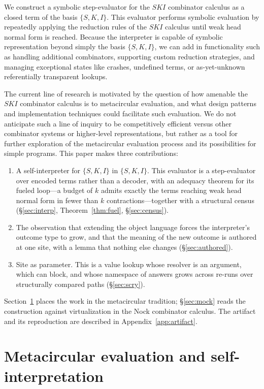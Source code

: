 \documentclass[review]{jfp-epi}
\begin{document}
We construct a symbolic step-evaluator for the $SKI$ combinator calculus
as a closed term of the basis $\{S,K,I\}$.  This evaluator performs
symbolic evaluation by repeatedly applying the reduction rules of the
$SKI$ calculus until weak head normal form is reached.  Because the interpreter is
capable of symbolic representation beyond simply the basis $\{S,K,I\}$,
we can add in functionality such as handling additional combinators,
supporting custom reduction strategies, and managing exceptional states
like crashes, undefined terms, or as-yet-unknown referentially
transparent lookups.

The current line of research is motivated by the question of how
amenable the $SKI$ combinator calculus is to metacircular evaluation,
and what design patterns and implementation techniques could facilitate
such evaluation.  We do not anticipate such a line of inquiry to be
competitively efficient versus other combinator systems or higher-level
representations, but rather as a tool for further exploration of the
metacircular evaluation process and its possibilities for simple
programs.  This paper makes three contributions:
\begin{enumerate}[nosep]
\item A self-interpreter for $\{S,K,I\}$ in $\{S,K,I\}$.  This evaluator
  is a step-evaluator over encoded terms rather than a decoder, with an
  adequacy theorem for its fueled loop---a budget of $k$ admits exactly
  the terms reaching weak head normal form in fewer than $k$
  contractions---together with a structural census (\S\ref{sec:interp},
  Theorem~\ref{thm:fuel}, \S\ref{sec:census}).
\item The observation that extending the object language forces the
  interpreter's outcome type to grow, and that the meaning of the new
  outcome is authored at one site, with a lemma that nothing else changes
  (\S\ref{sec:authored}).
\item Site as parameter.  This is a value lookup whose resolver is an
  argument, which can block, and whose namespace of answers grows across
  re-runs over structurally compared paths (\S\ref{sec:scry}).
\end{enumerate}
Section~\ref{sec:related} places the work in the metacircular tradition;
\S\ref{sec:mock} reads the construction against virtualization in the
Nock combinator calculus. The artifact and its reproduction are
described in Appendix~\ref{app:artifact}.

\section{Metacircular evaluation and self-interpretation}\label{sec:related}
\end{document}
